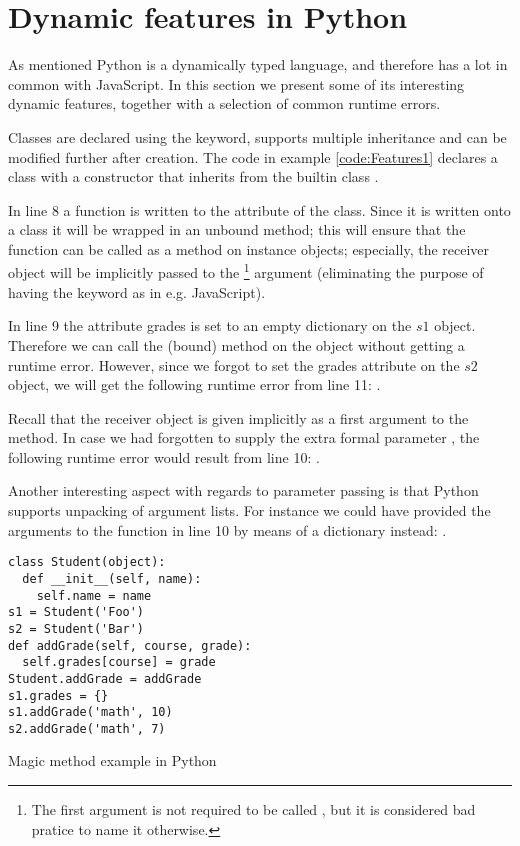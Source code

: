 \chapter{Dynamic features in Python}
As mentioned Python is a dynamically typed language, and therefore has a lot in common with JavaScript. In this section we present some of its interesting dynamic features, together with a selection of common runtime errors.

Classes are declared using the  keyword, supports multiple inheritance and can be modified further after creation. 
The code in example \ref{code:Features1} declares a class  with a constructor that inherits from the builtin class .

In line 8 a function  is written to the  attribute of the  class. Since it is written onto a class it will be wrapped in an unbound method; this will ensure that the function can be called as a method on instance objects; especially, the receiver object will be implicitly passed to the \footnote{The first argument is not required to be called , but it is considered bad pratice to name it otherwise.} argument (eliminating the purpose of having the  keyword as in e.g. JavaScript).

In line 9 the attribute grades is set to an empty dictionary on the $s1$ object. Therefore we can call the (bound) method  on the  object without getting a runtime error. However, since we forgot to set the grades attribute on the $s2$ object, we will get the following runtime error from line 11: . 

Recall that the receiver object is given implicitly as a first argument to the  method. 
In case we had forgotten to supply the extra formal parameter , the following runtime error would result from line 10:
. 

Another interesting aspect with regards to parameter passing is that Python supports unpacking of argument lists. For instance we could have provided the arguments to the  function in line 10 by means of a dictionary instead: 
.

\begin{listing}[H]
  \begin{verbatim}
class Student(object):
  def __init__(self, name):
    self.name = name
s1 = Student('Foo')
s2 = Student('Bar')
def addGrade(self, course, grade):
  self.grades[course] = grade
Student.addGrade = addGrade
s1.grades = {}
s1.addGrade('math', 10)
s2.addGrade('math', 7)
  \end{verbatim}
  \caption{Magic method example in Python}
  \label{code:Features1}
\end{listing}

